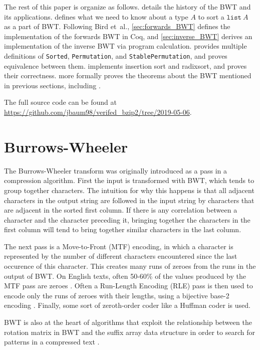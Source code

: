 \documentclass[11pt]{thesis}
\begin{document}
The rest of this paper is organize as follows.  details
the history of the BWT and its applications.  defines
what we need to know about a type $A$ to sort a $\mathtt{list}~A$ as a
part of BWT. Following Bird et~al., \cref{sec:forwards_BWT} defines
the implementation of the forwards BWT in Coq, and
\cref{sec:inverse_BWT} derives an implementation of the inverse BWT
via program calculation.  provides
multiple definitions of \texttt{Sorted}, \texttt{Permutation}, and
\texttt{StablePermutation}, and proves equivalence between them.
 implements insertion sort and radixsort, and proves
their correctness.  more formally proves the
theorems about the BWT mentioned in previous sections, including
.

The full source code can be found at
\url{https://github.com/jbaum98/verifed_bzip2/tree/2019-05-06}.

\section{Burrows-Wheeler}
\label{sec:bwt}

The Burrows-Wheeler transform was originally introduced as a pass in a
compression algorithm. First the input is transformed with BWT, which
tends to group together characters. The intuition for why this happens
is that all adjacent characters in the output string are followed in
the input string by characters that are adjacent in the sorted first
column. If there is any correlation between a character and the
character preceding it, bringing together the characters in the first
column will tend to bring together similar characters in the last
column.

The next pass is a Move-to-Front (MTF) encoding, in which a character
is represented by the number of different characters encountered since
the last occurence of this character. This creates many runs of zeroes
from the runs in the output of BWT. On English texts, often 50-60\% of
the values produced by the MTF pass are zeroes
\cite{fenwick2007,bw-analysis}. Often a Run-Length Encoding (RLE) pass
is then used to encode only the runs of zeroes with their lengths,
using a bijective base-2 encoding \cite{bw-analysis, tsai_2016}.
Finally, some sort of zeroth-order coder like a Huffman coder is used.

BWT is also at the heart of algorithms that exploit the relationship
between the rotation matrix in BWT and the suffix array data structure
in order to search for patterns in a compressed text
\cite{ferragina_index}.
\end{document}
